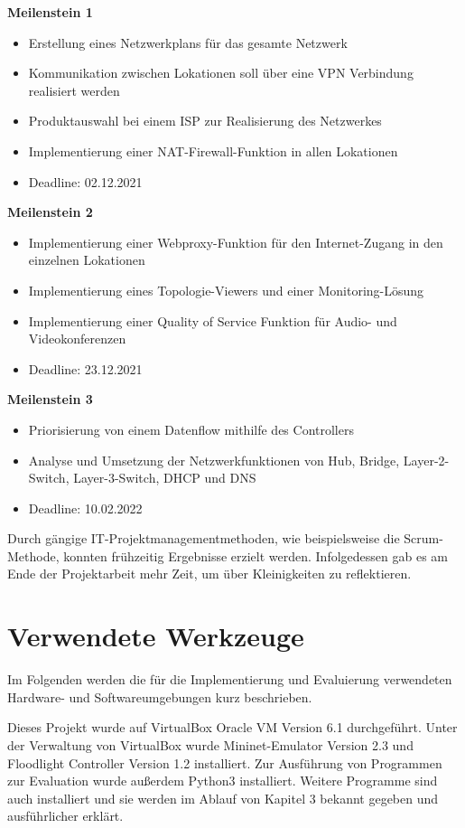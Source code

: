 \documentclass[fontsize=12pt,paper=a4,open=any,parskip=half,
  twoside=false,toc=listof,toc=bibliography,fleqn,leqno,
  captions=nooneline,captions=tableabove,british]{scrbook}
\begin{document}
\textbf{Meilenstein 1}
\begin{itemize}
 \item Erstellung eines Netzwerkplans für das gesamte Netzwerk
 \item Kommunikation zwischen Lokationen soll über eine VPN Verbindung realisiert werden
 \item Produktauswahl bei einem ISP zur Realisierung des Netzwerkes
 \item Implementierung einer NAT-Firewall-Funktion in allen Lokationen
 \item Deadline: 02.12.2021
\end{itemize}

\textbf{Meilenstein 2}
\begin{itemize}
 \item Implementierung einer Webproxy-Funktion für den Internet-Zugang in den einzelnen Lokationen
 \item Implementierung eines Topologie-Viewers und einer Monitoring-Lösung
 \item Implementierung einer Quality of Service Funktion für Audio- und Videokonferenzen
 \item Deadline: 23.12.2021
\end{itemize}

\textbf{Meilenstein 3}
\begin{itemize}
 \item Priorisierung von einem Datenflow mithilfe des Controllers
 \item Analyse und Umsetzung der Netzwerkfunktionen von Hub, Bridge, Layer-2-Switch, Layer-3-Switch, DHCP und DNS
 \item Deadline: 10.02.2022
\end{itemize}

Durch gängige IT-Projektmanagementmethoden, wie beispielsweise die Scrum-Methode, konnten frühzeitig Ergebnisse erzielt werden. Infolgedessen gab es am Ende der Projektarbeit mehr Zeit, um über Kleinigkeiten zu reflektieren.

\section{Verwendete Werkzeuge}
Im Folgenden werden die für die Implementierung und Evaluierung verwendeten Hardware- und Softwareumgebungen kurz beschrieben.\par
Dieses Projekt wurde auf VirtualBox Oracle VM Version 6.1 durchgeführt. Unter der Verwaltung von VirtualBox wurde Mininet-Emulator Version 2.3 und Floodlight Controller Version 1.2 installiert. Zur Ausführung von Programmen zur Evaluation wurde außerdem Python3 installiert. Weitere Programme sind auch installiert und sie werden im Ablauf von Kapitel 3 bekannt gegeben und ausführlicher erklärt.
\end{document}
